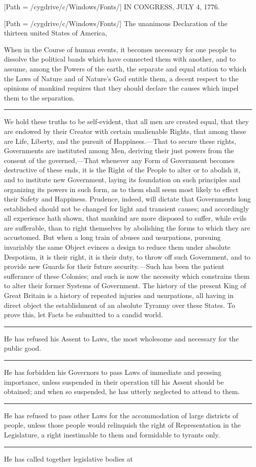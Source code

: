 \documentclass{article}
\begin{document}
\begin{center}
[Path = /cygdrive/c/Windows/Fonts/]
\Huge{}I\huge{}N \Huge CONGRESS, J\huge{}ULY \Huge 4, 1776.
\end{center}

\noindent{}[Path = /cygdrive/c/Windows/Fonts/] \LARGE The unanimous Declaration \normalsize of the thirteen united \LARGE States of America,

\vspace{1.5ex}

\large When \normalsize \rmfamily in the Course of human events, it becomes necessary for one people to dissolve the political bands which have connected them with another, and to assume, among the Powers of the earth, the separate and equal station to which the Laws of Nature and of Nature's God entitle them, a decent respect to the opinions of mankind requires that they should declare the causes which impel them to the separation.\rule[.5ex]{4em}{.2pt}We hold these truths to be self-evident, that all men are created equal, that they are endowed by their Creator with certain unalienable Rights, that among these are Life, Liberty, and the pursuit of Happiness.---That to secure these rights, Governments are instituted among Men, deriving their just powers from the consent of the governed,---That whenever any Form of Government becomes destructive of these ends, it is the Right of the People to alter or to abolish it, and to institute new Government, laying its foundation on such principles and organizing its powers in such form, as to them shall seem most likely to effect their Safety and Happiness. Prudence, indeed, will dictate that Governments long established should not be changed for light and transient causes; and accordingly all experience hath shown, that mankind are more disposed to suffer, while evils are sufferable, than to right themselves by abolishing the forms to which they are accustomed. But when a long train of abuses and usurpations, pursuing invariably the same Object evinces a design to reduce them under absolute Despotism, it is their right, it is their duty, to throw off such Government, and to provide new Guards for their future security.---Such has been the patient sufferance of these Colonies; and such is now the necessity which constrains them to alter their former Systems of Government. The history of the present King of Great Britain is a history of repeated injuries and usurpations, all having in direct object the establishment of an absolute Tyranny over these States. To prove this, let Facts be submitted to a candid world.\rule[.5ex]{3em}{.2pt}He has refused his Assent to Laws, the most wholesome and necessary for the public good.\rule[.5ex]{2em}{.2pt}He has forbidden his Governors to pass Laws of immediate and pressing importance, unless suspended in their operation till his Assent should be obtained; and when so suspended, he has utterly neglected to attend to them.\rule[.5ex]{2em}{.2pt}He has refused to pass other Laws for the accommodation of large districts of people, unless those people would relinquish the right of Representation in the Legislature, a right inestimable to them and formidable to tyrants only.\rule[.5ex]{2em}{.2pt}He has called together legislative bodies at 
\end{document}

